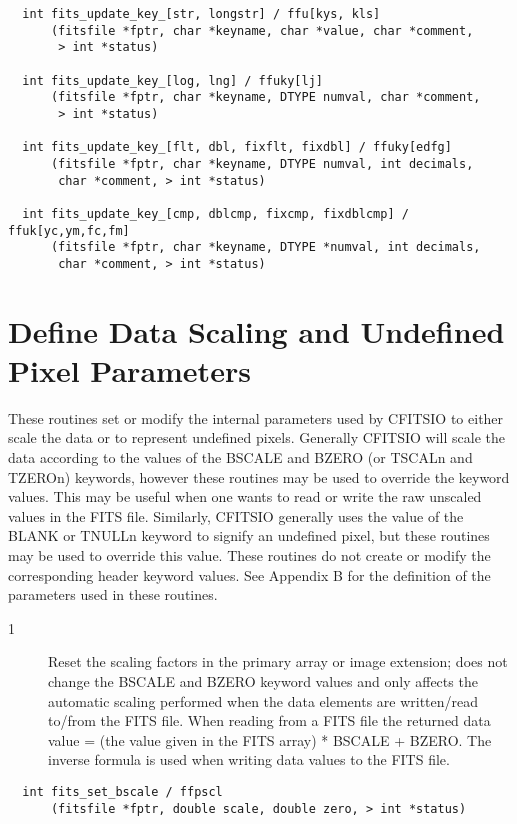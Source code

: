 \documentclass[11pt]{book}
\begin{document}
\begin{verbatim}
  int fits_update_key_[str, longstr] / ffu[kys, kls]
      (fitsfile *fptr, char *keyname, char *value, char *comment,
       > int *status)

  int fits_update_key_[log, lng] / ffuky[lj]
      (fitsfile *fptr, char *keyname, DTYPE numval, char *comment,
       > int *status)

  int fits_update_key_[flt, dbl, fixflt, fixdbl] / ffuky[edfg]
      (fitsfile *fptr, char *keyname, DTYPE numval, int decimals,
       char *comment, > int *status)

  int fits_update_key_[cmp, dblcmp, fixcmp, fixdblcmp] / ffuk[yc,ym,fc,fm]
      (fitsfile *fptr, char *keyname, DTYPE *numval, int decimals,
       char *comment, > int *status)
\end{verbatim}


\section{Define Data Scaling and Undefined Pixel Parameters}

These routines set or modify the internal parameters used by CFITSIO
to either scale the data or to represent undefined pixels.  Generally
CFITSIO will scale the data according to the values of the BSCALE and
BZERO (or TSCALn and TZEROn) keywords, however these routines may be
used to override the keyword values.  This may be useful when one wants
to read or write the raw unscaled values in the FITS file.  Similarly,
CFITSIO generally uses the value of the BLANK or TNULLn keyword to
signify an undefined pixel, but these routines may be used to override
this value.  These routines do not create or modify the corresponding
header keyword values.  See Appendix B for the definition of the
parameters used in these routines.


\begin{description}
\item[1 ] Reset the scaling factors in the primary array or image extension; does
    not change the BSCALE and BZERO keyword values and only affects the
    automatic scaling performed when the data elements are written/read
    to/from the FITS file.   When reading from a FITS file the returned
    data value = (the value given in the FITS array) * BSCALE + BZERO.
    The inverse formula is used when writing data values to the FITS
   file. \label{ffpscl}
\end{description}

\begin{verbatim}
  int fits_set_bscale / ffpscl
      (fitsfile *fptr, double scale, double zero, > int *status)
\end{verbatim}
\end{document}
